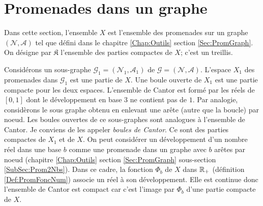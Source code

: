 \section{Promenades dans un graphe}
Dans cette section, l'ensemble $X$ est l'ensemble des promenades sur un graphe $(\mathcal{N}, \mathcal{A})$ tel que défini dans le chapitre \ref{Chap:Outils} section \ref{Sec:PromGraph}.\newline
On désigne par $\mathfrak{K}$ l'ensemble des parties compactes de $X$; c'est un treillis. 
\begin{explen} \label{Exple:PromCantor}
Considérons un sous-graphe $\mathcal{G}_1 = (\mathcal{N}_1,\mathcal{A}_1)$ de $\mathcal{G} = (\mathcal{N},\mathcal{A})$. L'espace $X_1$ des promenades dans $\mathcal{G}_1$ est une partie de $X$. Une boule ouverte de $X_1$ est une partie compacte pour les deux espaces.\newline
L'ensemble de Cantor est formé par les réels de $[0,1]$ dont le développement en base $3$ ne contient pas de $1$. Par analogie, considèrons le sous graphe obtenu en enlevant une arête (autre que la boucle) par noeud. Les boules ouvertes de ce sous-graphes sont analogues à l'ensemble de Cantor. Je conviens de les appeler \emph{boules de Cantor}. Ce sont des parties compactes de $X_1$ et de $X$.\newline
On peut considérer un développement d'un nombre réel dans une base $b$ comme une promenade dans un graphe avec $b$ arêtes par noeud (chapitre \ref{Chap:Outils} section \ref{Sec:PromGraph} sous-section \ref{SubSec:Prom2Nbs}). Dans ce cadre, la fonction $\Phi_b$ de $X$ dans $\mathbb{R}_+$ (définition \ref{Def:PromFoncNum}) associe un réel à son développement. Elle est continue donc  l'ensemble de Cantor est compact car c'est l'image par $\Phi_b$ d'une partie compacte de $X$.
\end{explen}


